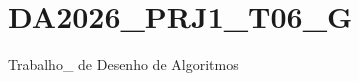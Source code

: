 \chapter{DA2026\+\_\+\+PRJ1\+\_\+\+T06\+\_\+G }
\hypertarget{md__r_e_a_d_m_e}{}\label{md__r_e_a_d_m_e}
\label{md__r_e_a_d_m_e_autotoc_md0}%
%


Trabalho\+\_ de Desenho de Algoritmos 